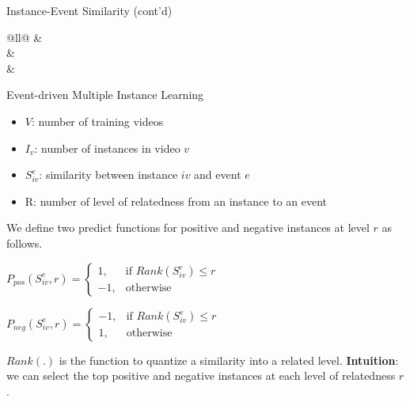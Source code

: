 \documentclass{beamer}
\begin{document}
\begin{frame}{Instance-Event Similarity (cont'd)}
\begin{table}[h]
\begin{tabular}{@{}ll@{}}
		              &                                                                         \\ \midrule
		        &      \\ \midrule
		               &                                                                     \\ \bottomrule
	\end{tabular}
\end{table}
	
\end{frame}	

\begin{frame}{Event-driven Multiple Instance Learning} 	
	
	\begin{itemize}	
		\item $V$: number of training videos
		\item $I_{v}$: number of instances in video $v$
		\item $S_{iv}^{e}$: similarity between instance $iv$ and event $e$ 
		\item R: number of level of relatedness from an instance to an event
	\end{itemize}
We define two predict functions for positive and negative instances at level $r$ as follows. \\
	\begin{center}
$
P_{pos}(S_{iv}^{e},r) = 
\begin{cases}
1,& \text{if } Rank(S_{iv}^{e}) \leq r \\
-1,              & \text{otherwise}
\end{cases}
$

$
P_{neg}(S_{iv}^{e},r) = 
\begin{cases}
-1,& \text{if } Rank(S_{iv}^{e}) \leq r \\
1,              & \text{otherwise}
\end{cases}
$
\end{center}

$Rank(.)$ is the function to quantize a similarity into a related level.
\textbf{Intuition}: we can select the top positive and negative instances at each level of relatedness $r$.
\end{frame}	
\end{document}
